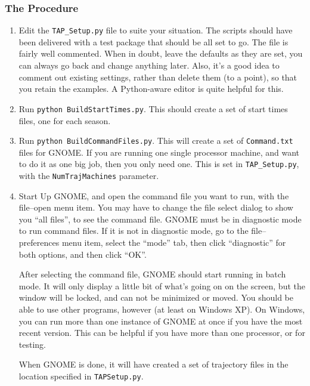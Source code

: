 \documentclass[12pt]{article}      %
\newcommand{\gnome}{\textsf{GNOME}\xspace}
\newcommand{\filename}[1]{\texttt{#1}}
\newcommand{\command}[1]{\texttt{#1}}
\begin{document}
\subsubsection{The Procedure}
\begin{enumerate}
\item Edit the \filename{TAP\_Setup.py} file to suite your situation. The
  scripts should have been delivered with a test package that should be
  all set to go. The file is fairly well commented. When in doubt, leave
  the defaults as they are set, you can always go back and change
  anything later. Also, it's a good idea to comment out existing
  settings, rather than delete them (to a point), so that you retain the
  examples. A Python-aware editor is quite helpful for this.

\item Run \command{python BuildStartTimes.py}. This should create a set
  of start times files, one for each season.

\item Run \command{python BuildCommandFiles.py}. This will create a set
  of \filename{Command.txt} files for \gnome. If you are running one
  single processor machine, and want to do it as one big job, then you
  only need one. This is set in \filename{TAP\_Setup.py}, with the
  \command{NumTrajMachines} parameter. 
  
\item Start Up \gnome, and open the command file you want to run, with
  the \mbox{file--open} menu item. You may have to change the file
  select dialog to show you ``all files'', to see the command file.
  \gnome must be in diagnostic mode to run command files. If it is not in
  diagnostic mode, go to the \mbox{file--preferences} menu item, select
  the ``mode'' tab, then click ``diagnostic'' for both options, and then
  click ``OK''.
  
  After selecting the command file, \gnome should start running in batch
  mode. It will only display a little bit of what's going on on the
  screen, but the window will be locked, and can not be minimized or
  moved. You should be able to use other programs, however (at least on
  Windows XP). On Windows, you can run more than one instance of \gnome
  at once if you have the most recent version. This can be helpful if
  you have more than one processor, or for testing.

  When \gnome is done, it will have created a set of trajectory files
  in the location specified in \filename{TAP\-Setup.py}.


\end{enumerate}
\end{document}
